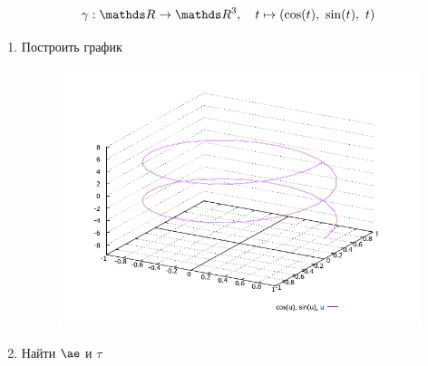 \documentclass[main]{subfiles}
\begin{document}
    \begin{Task}
      \[\gamma: \R \ra \R^3,\q t \mapsto (\cos(t),\ \sin(t),\ t)\]
      \begin{enumerate}
        \item Построить график
        \begin{figure}[H]
            \includegraphics[scale=0.6]{pics/2_3.png}
            \centering
        \end{figure}
        \item Найти $\ae$ и $\tau$
      \end{enumerate}
    \end{Task}
\end{document}
